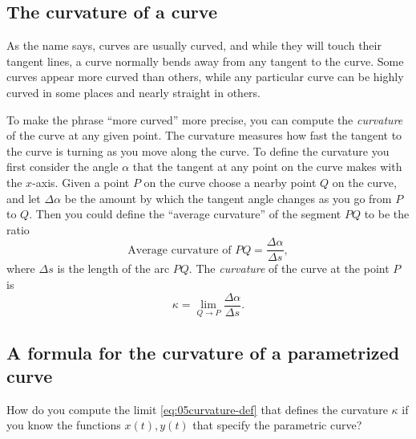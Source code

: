 \subsection{The curvature of a curve} %
As the name says, curves are usually curved, and while they will touch
their tangent lines, a curve normally bends away from any tangent to
the curve.  Some curves appear more curved than others, while any
particular curve can be highly curved in some places and nearly
straight in others.

To make the phrase ``more curved'' more precise, you can compute the
\emph{curvature} of the curve at any given point.  The curvature
measures how fast the tangent to the curve is turning as you move
along the curve.  To define the curvature you first consider the angle
$\alpha$ that the tangent at any point on the curve makes with the
$x$-axis.  Given a point $P$ on the curve choose a nearby point $Q$
on the curve, and let $\Delta\alpha$ be the amount by which the
tangent angle changes as you go from $P$ to $Q$.  Then you could
define the ``average curvature'' of the segment $PQ$ to be the ratio
\[
\text{Average curvature of } PQ
= \frac{\Delta\alpha} {\Delta s},
\]
\marginpar{ }%
where $\Delta s$ is the length of the arc $PQ$.  The \emph{curvature}
of the curve at the point $P$ is
\begin{equation}
  \kappa
  = \lim_{Q\to P}  \frac{\Delta\alpha} {\Delta s}.
  \label{eq:05curvature-def}
\end{equation}




\subsection{A formula for the curvature of a parametrized curve} %
\label{sec:formula-curvature-parametrized-curve}
How do you compute the limit \eqref{eq:05curvature-def} that defines
the curvature $\kappa$ if you know the functions $x(t), y(t)$ that specify the
parametric curve?




